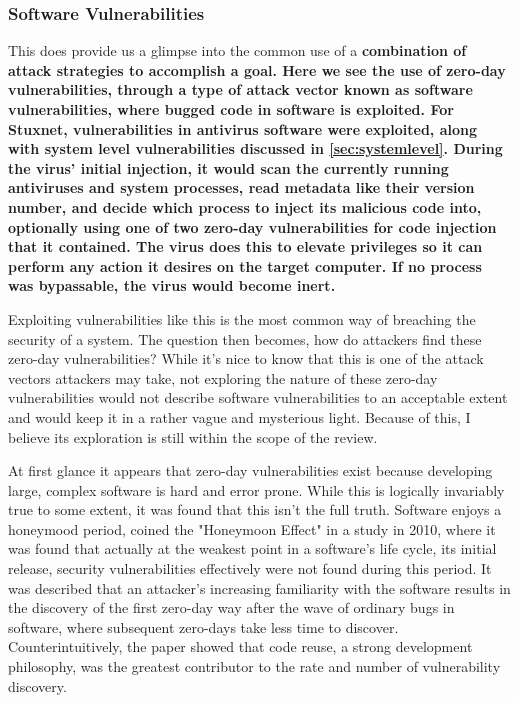 \documentclass[a4paper, 11pt]{article}
\begin{document}
\subsubsection{Software Vulnerabilities}
\label{sec:softwarevul}
This does provide us a glimpse into the common use of a \bfseries combination \mdseries of attack strategies to accomplish a goal. Here we see the use of zero-day vulnerabilities, through a type of attack vector known as software vulnerabilities, where bugged code in software is exploited. \cite{ref:singer2014cybersecurity} For Stuxnet, vulnerabilities in antivirus software were exploited, along with system level vulnerabilities discussed in  \ref{sec:systemlevel}. During the virus' initial injection, it would scan the currently running antiviruses and system processes, read metadata like their version number, and decide which process to inject its malicious code into, optionally using one of two zero-day vulnerabilities for code injection that it contained. \cite{ref:stuxnet2011report} The virus does this to elevate privileges so it can perform any action it desires on the target computer. \cite{ref:stuxnet2011report} If no process was bypassable, the virus would become inert. \cite{ref:stuxnet2011report}

Exploiting vulnerabilities like this is the most common way of breaching the security of a system. \cite{ref:biometricattackvectors,ref:ibmbiometrics,ref:honeymoonsoftware} The question then becomes, how do attackers find these zero-day vulnerabilities? While it's nice to know that this is one of the attack vectors attackers may take, not exploring the nature of these zero-day vulnerabilities would not describe software vulnerabilities to an acceptable extent and would keep it in a rather vague and mysterious light. Because of this, I believe its exploration is still within the scope of the review.

At first glance it appears that zero-day vulnerabilities exist because developing large, complex software is hard and error prone. While this is logically invariably true to some extent, it was found that this isn't the full truth. Software enjoys a honeymood period, \cite{ref:honeymoonsoftware} coined the "Honeymoon Effect" in a study in 2010, where it was found that actually at the weakest point in a software's life cycle, its initial release, security vulnerabilities effectively were not found during this period. It was described that an attacker's increasing familiarity with the software results in the discovery of the first zero-day way after the wave of ordinary bugs in software, where subsequent zero-days take less time to discover. Counterintuitively, the paper showed that code reuse, a strong development philosophy, was the greatest contributor to the rate and number of vulnerability discovery.
\end{document}
